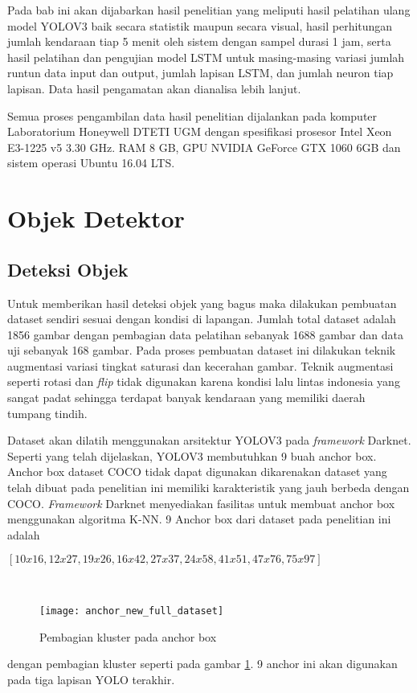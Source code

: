 \documentclass[../thesis.tex]{subfiles}
\begin{document}
Pada bab ini akan dijabarkan hasil penelitian yang meliputi hasil pelatihan ulang model YOLOV3 baik secara statistik maupun secara visual, hasil perhitungan jumlah kendaraan tiap 5 menit oleh sistem dengan sampel durasi 1 jam, serta hasil pelatihan dan pengujian model LSTM untuk masing-masing variasi jumlah runtun data input dan output, jumlah lapisan LSTM, dan jumlah neuron tiap lapisan. Data hasil pengamatan akan dianalisa lebih lanjut.

Semua proses pengambilan data hasil penelitian dijalankan pada komputer Laboratorium Honeywell DTETI UGM dengan spesifikasi prosesor Intel Xeon E3-1225 v5 3.30 GHz.
RAM 8 GB, GPU NVIDIA GeForce GTX 1060 6GB dan sistem operasi Ubuntu 16.04 LTS.

\section{Objek Detektor}
\subsection{Deteksi Objek}
Untuk memberikan hasil deteksi objek yang bagus maka dilakukan pembuatan dataset sendiri sesuai dengan kondisi di lapangan. 
Jumlah total dataset adalah 1856 gambar dengan pembagian data pelatihan sebanyak 1688 gambar dan data uji sebanyak 168 gambar.
Pada proses pembuatan dataset ini dilakukan teknik augmentasi variasi tingkat saturasi dan kecerahan gambar. Teknik augmentasi seperti rotasi dan \textit{flip} tidak digunakan karena kondisi lalu lintas indonesia yang sangat padat sehingga 
terdapat banyak kendaraan yang memiliki daerah tumpang tindih.

Dataset akan dilatih menggunakan arsitektur YOLOV3 pada \textit{framework} Darknet. Seperti yang telah dijelaskan, YOLOV3 membutuhkan 
9 buah anchor box. Anchor box dataset COCO tidak dapat digunakan dikarenakan dataset yang telah dibuat pada penelitian ini memiliki karakteristik yang jauh berbeda dengan COCO.
\textit{Framework} Darknet menyediakan fasilitas untuk membuat anchor box menggunakan algoritma K-NN. 9 Anchor box dari dataset pada penelitian ini adalah \\
\centerline{$[10x16, 12x27,  19x26,  16x42,  27x37,  24x58,  41x51, 47x76, 75x97]$}\

\begin{figure}[htp]
	\centering
	\texttt{[image: anchor\_new\_full\_dataset]}
	\caption{Pembagian kluster pada anchor box}
	\label{anchor_dataset}
\end{figure}
dengan pembagian kluster seperti pada gambar \ref{anchor_dataset}. 9 anchor ini akan digunakan pada tiga lapisan YOLO terakhir.
\end{document}
